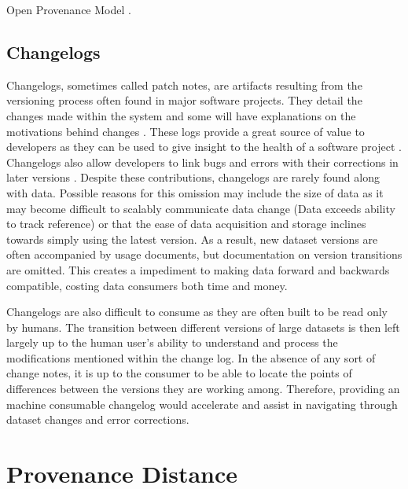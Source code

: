 Open Provenance Model \cite{moreau2008open}.

\subsection{Changelogs}

Changelogs, sometimes called patch notes, are artifacts resulting from the versioning process often found in major software projects.
They detail the changes made within the system and some will have explanations on the motivations behind changes \cite{uel1037}.
These logs provide a great source of value to developers as they can be used to give insight to the health of a software project \cite{German03automatingthe} \cite{6132954}.
Changelogs also allow developers to link bugs and errors with their corrections in later versions \cite{Chen:2004:OCL:990374.990391}.
Despite these contributions, changelogs are rarely found along with data.
Possible reasons for this omission may include the size of data  as it may become difficult to scalably communicate data change (Data exceeds ability to track reference) or that the ease of data acquisition and storage inclines towards simply using the latest version.
As a result, new dataset versions are often accompanied by usage documents, but documentation on version transitions are omitted.
This creates a impediment to making data forward and backwards compatible, costing data consumers both time and money.

Changelogs are also difficult to consume as they are often built to be read only by humans.
The transition between different versions of large datasets is then left largely up to the human user's ability to understand and process the modifications mentioned within the change log.
In the absence of any sort of change notes, it is up to the consumer to be able to locate the points of differences between the versions they are working among.
Therefore, providing an machine consumable changelog would accelerate and assist in navigating through dataset changes and error corrections.

\section{Provenance Distance}

